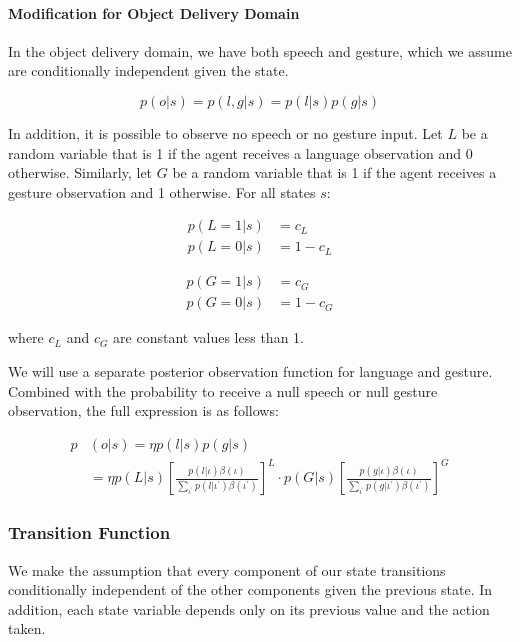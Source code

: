 \documentclass[conference]{IEEEtran}
\begin{document}
\paragraph{Modification for Object Delivery Domain}


In the object delivery domain, we have both speech and gesture, which we assume are conditionally independent given the state. 

$$p(o|s) = p(l, g | s) =  p(l|s)p(g|s)$$

In addition, it is possible to observe no speech or no gesture input. Let $L$ be a random variable that is 1 if the agent receives a language observation and 0 otherwise. Similarly, let $G$ be a random variable that is 1 if the agent receives a gesture observation and 1 otherwise. For all states $s$: 

\begin{align*}
	p(L = 1 | s) &= c_L \\
	p(L = 0 | s) &= 1 - c_L 
\end{align*}

\begin{align*}
	p(G = 1 | s) &= c_G \\
	p(G = 0 | s) &= 1 - c_G 
\end{align*}

where $c_L$ and $c_G$ are constant values less than 1. 

We will use a separate posterior observation function for language and gesture. Combined with the probability to receive a null speech or null gesture observation, the full expression is as follows: 



\begin{align*}
	p&(o|s) = \eta p(l|s) p(g|s)  \\
	&= \eta p(L|s) \left[ \frac{p(l|\iota) \beta(\iota)}{\sum_{\iota^\prime} p(l|\iota^\prime)\beta(\iota^\prime)} \right] ^ L \cdot p(G|s) \left[ \frac{p(g|\iota) \beta(\iota)}{\sum_{\iota^\prime} p(g|\iota^\prime)\beta(\iota^\prime)} \right]^G
\end{align*}




\subsubsection{Transition Function} \label{sssec:tf}

We make the assumption that every component of our state transitions conditionally independent of the other components given the previous state. In addition, each state variable depends only on its previous value and the action taken. 
\end{document}
